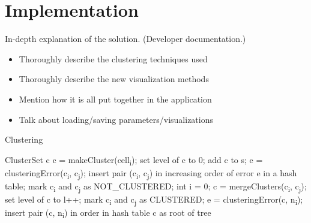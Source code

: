 \chapter{Implementation}

In-depth explanation of the solution. (Developer documentation.)

\begin{itemize}
\item Thoroughly describe the clustering techniques used
\item Thoroughly describe the new visualization methods
\item Mention how it is all put together in the application
\item Talk about loading/saving parameters/visualizations
\end{itemize}

\begin{algorithm}[H]
\caption{Clustering}
\begin{algorithmic}[1]

\Require ClusterSet c
\Statex
{}
	\State c = makeCluster(cell\textsubscript{i});
    \State set level of c to 0;
    \State add c to s;
\EndFor
\Statex
{}
    	\State e = clusteringError(c\textsubscript{i}, c\textsubscript{j});
        \State insert pair (c\textsubscript{i}, c\textsubscript{j}) in increasing order of error e in a hash table;
        \State mark c\textsubscript{i} and c\textsubscript{j} as NOT\_CLUSTERED;
    \EndFor
\EndFor
\Statex
\State int i = 0;
    	\State c = mergeClusters(c\textsubscript{i}, c\textsubscript{j});
        set level of c to l++;
        mark c\textsubscript{i} and c\textsubscript{j} as CLUSTERED;
        	\State e = clusteringError(c, n\textsubscript{i});
            insert pair (c, n\textsubscript{i}) in order in hash table
        \EndFor
    \EndIf
\EndFor
\Statex
\Return c as root of tree
\end{algorithmic}
\end{algorithm}